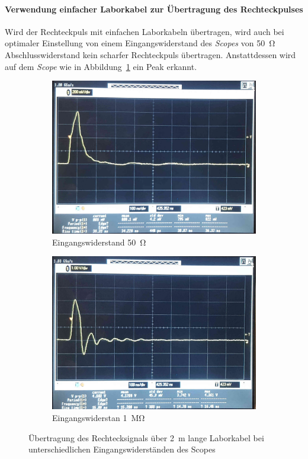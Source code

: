 \documentclass[a4paper,twoside,final]{article}
\begin{document}
\paragraph{Verwendung einfacher Laborkabel zur Übertragung des Rechteckpulses}
Wird der Rechteckpuls mit einfachen Laborkabeln übertragen, wird auch bei optimaler Einstellung von einem Eingangswiderstand des \textit{Scopes} von \SI{50}{\ohm} Abschlusswiderstand kein scharfer Rechteckpuls übertragen. Anstattdessen wird auf dem \textit{Scope} wie in Abbildung~\ref{fig:Rechtecksignal_Laborkabel} ein Peak erkannt.
\begin{figure}[htp]
    \centering
    \begin{subfigure}{0.45\textwidth}
        \includegraphics[width=\textwidth]{Bilder/Bild9.jpg}
        \caption{Eingangswiderstand \SI{50}{\ohm}}
    \end{subfigure}\hspace{1cm}
    \begin{subfigure}{0.45\textwidth}
        \includegraphics[width=\textwidth]{Bilder/Bild10.jpg}
        \caption{Eingangswiderstan \SI{1}{\mega\ohm}}
    \end{subfigure}
    \caption{Übertragung des Rechtecksignals über \SI{2}{\metre} lange Laborkabel bei unterschiedlichen Eingangswiderständen des Scopes}
    \label{fig:Rechtecksignal_Laborkabel}
\end{figure}\\
\end{document}
